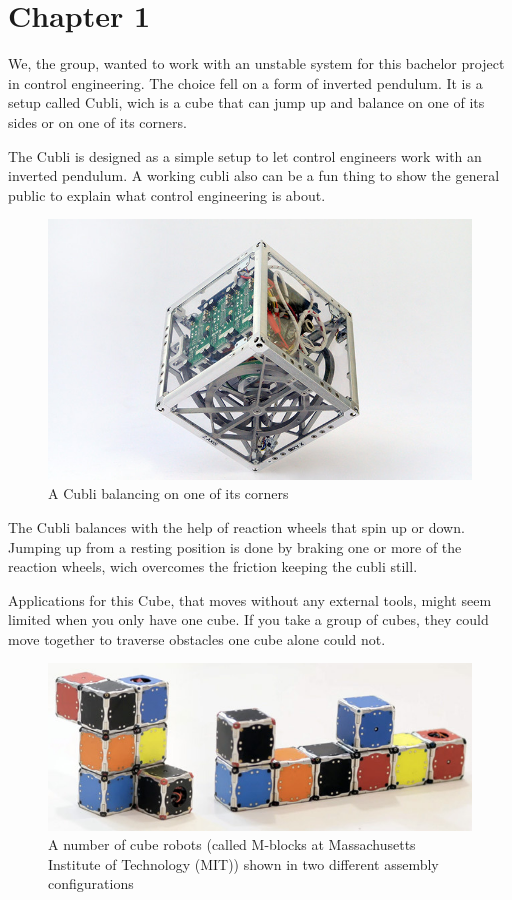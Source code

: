 \chapter{Chapter 1}
We, the group, wanted to work with an unstable system for this bachelor project in control engineering. The choice fell on a form of inverted pendulum. It is a setup called Cubli, wich is a cube that can jump up and balance on one of its sides or on one of its corners.

The Cubli is designed as a simple setup to let control engineers work with an inverted pendulum. A working cubli also can be a fun thing to show the general public to explain what control engineering is about.  \cite{MGajamohan}

\begin{figure}[H] 
	\centering 
	\includegraphics[scale=1.5]{figures/CubliCorner-700x430}
	\caption{A Cubli balancing on one of its corners\cite{RAndrea}}
	\label{CubliCorner}
\end{figure} 

The Cubli balances with the help of reaction wheels that spin up or down. Jumping up from a resting position is done by braking one or more of the reaction wheels, wich overcomes the friction keeping the cubli still. 

Applications for this Cube, that moves without any external tools, might seem limited when you only have one cube. If you take a group of cubes, they could move together to traverse obstacles one cube alone could not. \cite{JRomanishin}

\begin{figure}[H] 
	\centering 
	\includegraphics[scale=0.5]{figures/m-blocks}
	\caption{A number of cube robots (called M-blocks at Massachusetts Institute of Technology (MIT)) shown in two different assembly configurations\cite{LRosen}}
	\label{MBlocksExample}
\end{figure} 



